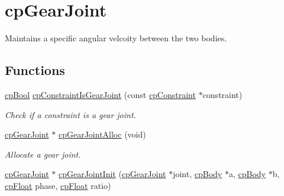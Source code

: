 \hypertarget{group__cp_gear_joint}{}\section{cp\+Gear\+Joint}
\label{group__cp_gear_joint}


Maintains a specific angular velcoity between the two bodies.  


\subsection*{Functions}
\begin{DoxyCompactItemize}
\item 
\hypertarget{group__cp_gear_joint_ga1a9591fac32dbc33f6e5730f7a281d71}{}\hyperlink{group__basic_types_gabc5e752c48f3449ca26ef413ecbd647e}{cp\+Bool} \hyperlink{group__cp_gear_joint_ga1a9591fac32dbc33f6e5730f7a281d71}{cp\+Constraint\+Is\+Gear\+Joint} (const \hyperlink{structcp_constraint}{cp\+Constraint} $\ast$constraint)\label{group__cp_gear_joint_ga1a9591fac32dbc33f6e5730f7a281d71}

\begin{DoxyCompactList}\small\item\em Check if a constraint is a gear joint. \end{DoxyCompactList}\item 
\hypertarget{group__cp_gear_joint_gaa2c7e23592c34b5a4ce2614147bb2199}{}\hyperlink{structcp_gear_joint}{cp\+Gear\+Joint} $\ast$ \hyperlink{group__cp_gear_joint_gaa2c7e23592c34b5a4ce2614147bb2199}{cp\+Gear\+Joint\+Alloc} (void)\label{group__cp_gear_joint_gaa2c7e23592c34b5a4ce2614147bb2199}

\begin{DoxyCompactList}\small\item\em Allocate a gear joint. \end{DoxyCompactList}\item 
\hypertarget{group__cp_gear_joint_ga80357534ab155c34491b87e8534547a3}{}\hyperlink{structcp_gear_joint}{cp\+Gear\+Joint} $\ast$ \hyperlink{group__cp_gear_joint_ga80357534ab155c34491b87e8534547a3}{cp\+Gear\+Joint\+Init} (\hyperlink{structcp_gear_joint}{cp\+Gear\+Joint} $\ast$joint, \hyperlink{structcp_body}{cp\+Body} $\ast$a, \hyperlink{structcp_body}{cp\+Body} $\ast$b, \hyperlink{group__basic_types_gac1ed65573e035bf892505768c852d8d3}{cp\+Float} phase, \hyperlink{group__basic_types_gac1ed65573e035bf892505768c852d8d3}{cp\+Float} ratio)\label{group__cp_gear_joint_ga80357534ab155c34491b87e8534547a3}


\end{DoxyCompactItemize}
